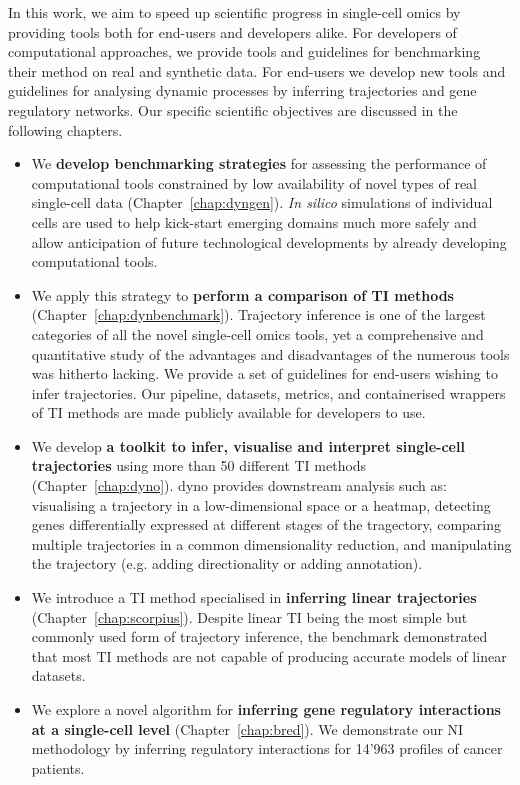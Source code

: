 In this work, we aim to speed up scientific progress in single-cell omics by providing tools both for end-users and developers alike. For developers of computational approaches, we provide tools and guidelines for benchmarking their method on real and synthetic data. For end-users we develop new tools and guidelines for analysing dynamic processes by inferring trajectories and gene regulatory networks. Our specific scientific objectives are discussed in the following chapters.

\begin{itemize}
	\item We \textbf{develop benchmarking strategies} for assessing the performance of computational tools constrained by low availability of novel types of real single-cell data (Chapter~\ref{chap:dyngen}). \textit{In silico} simulations of individual cells are used to help kick-start emerging domains much more safely and allow anticipation of future technological developments by already developing computational tools.
	\item We apply this strategy to \textbf{perform a comparison of TI methods} (Chapter~\ref{chap:dynbenchmark}). Trajectory inference is one of the largest categories of all the novel single-cell omics tools, yet a comprehensive and quantitative study of the advantages and disadvantages of the numerous tools was hitherto lacking. We provide a set of guidelines for end-users wishing to infer trajectories. Our pipeline, datasets, metrics, and containerised wrappers of TI methods are made publicly available for developers to use.
	\item We develop \textbf{a toolkit to infer, visualise and interpret single-cell trajectories} using more than 50 different TI methods (Chapter~\ref{chap:dyno}). dyno provides downstream analysis such as: visualising a trajectory in a low-dimensional space or a heatmap, detecting genes differentially expressed at different stages of the tragectory, comparing multiple trajectories in a common dimensionality reduction, and manipulating the trajectory (e.g. adding directionality or adding annotation).
	\item We introduce a TI method specialised in \textbf{inferring linear trajectories} (Chapter~\ref{chap:scorpius}). Despite linear TI being the most simple but commonly used form of trajectory inference, the benchmark demonstrated that most TI methods are not capable of producing accurate models of linear datasets.
	\item We explore a novel algorithm for \textbf{inferring gene regulatory interactions at a single-cell level} (Chapter~\ref{chap:bred}). We demonstrate our NI methodology by inferring regulatory interactions for 14'963 profiles of cancer patients.

\end{itemize}
